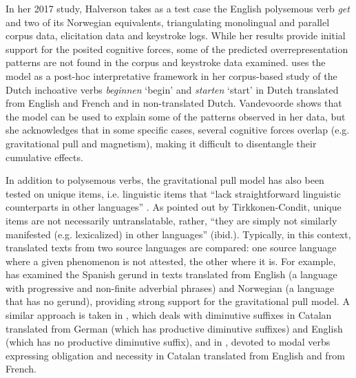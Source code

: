 \documentclass[output=paper]{langscibook}
\begin{document}
In her 2017 study, Halverson takes as a test case the English polysemous verb \textit{get} and two of its Norwegian equivalents, triangulating monolingual and parallel corpus data, elicitation data and keystroke logs. While her results provide initial support for the posited cognitive forces, some of the predicted overrepresentation patterns are not found in the corpus and keystroke data examined. \citet{Vandevoorde2020} uses the model as a post-hoc interpretative framework in her corpus-based study of the Dutch inchoative verbs \textit{beginnen} ‘begin’ and \textit{starten} ‘start’ in Dutch translated from English and French and in non-translated Dutch. Vandevoorde shows that the model can be used to explain some of the patterns observed in her data, but she acknowledges that in some specific cases, several cognitive forces overlap (e.g. gravitational pull and magnetism), making it difficult to disentangle their cumulative effects. 

In addition to polysemous verbs, the gravitational pull model has also been tested on unique items, i.e. linguistic items that “lack straightforward linguistic counterparts in other languages” \citep[177]{Tirkkonen-Condit2004}. As pointed out by Tirkkonen-Condit, unique items are not necessarily untranslatable, rather, “they are simply not similarly manifested (e.g. lexicalized) in other languages” (ibid.). Typically, in this context, translated texts from two source languages are compared: one source language where a given phenomenon is not attested, the other where it is. For example, \citet{Hareide2016} has examined the Spanish gerund in texts translated from English (a language with progressive and non-finite adverbial phrases) and Norwegian (a language that has no gerund), providing strong support for the gravitational pull model. A similar approach is taken in \citet{MarcoOster2018}, which deals with diminutive suffixes in Catalan translated from German (which has productive diminutive suffixes) and English (which has no productive diminutive suffix), and in \citet{Marco2021}, devoted to modal verbs expressing obligation and necessity in Catalan translated from English and from French. 
\end{document}
